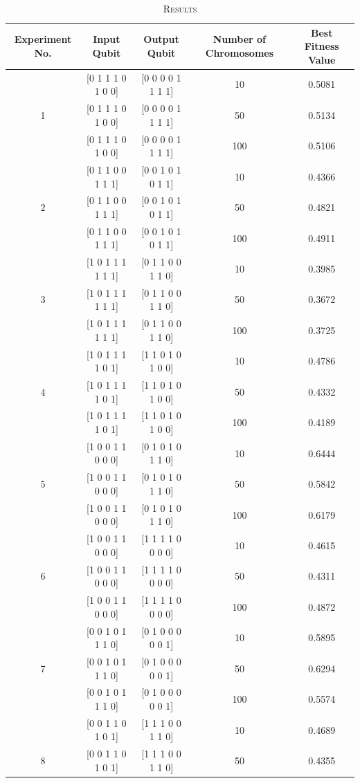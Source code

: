 \documentclass[conference]{IEEEtran}
\begin{document}
\begin{table}[!t]
\caption{\textsc{Results}}
\label{tab:2}
\centering
{
\begin{tabular}{| c | c | c | c | c |}
\hline
Experiment No. & Input Qubit & Output Qubit & Number of Chromosomes &  Best Fitness Value \\
\hline
 & [0 1 1 1 0 1 0 0] & [0 0 0 0 1 1 1 1] & 10 & 0.5081 \\
1 & [0 1 1 1 0 1 0 0] & [0 0 0 0 1 1 1 1] & 50 & 0.5134 \\
 & [0 1 1 1 0 1 0 0] & [0 0 0 0 1 1 1 1] & 100 & 0.5106 \\
\hline
 & [0 1 1 0 0 1 1 1] & [0 0 1 0 1 0 1 1] & 10 & 0.4366 \\
2 & [0 1 1 0 0 1 1 1] & [0 0 1 0 1 0 1 1] & 50 & 0.4821 \\
 & [0 1 1 0 0 1 1 1] & [0 0 1 0 1 0 1 1] & 100 & 0.4911 \\
\hline
 & [1 0 1 1 1 1 1 1] & [0 1 1 0 0 1 1 0] & 10 & 0.3985 \\
3 & [1 0 1 1 1 1 1 1] & [0 1 1 0 0 1 1 0] & 50 & 0.3672 \\
 & [1 0 1 1 1 1 1 1] & [0 1 1 0 0 1 1 0] & 100 & 0.3725 \\
\hline
 & [1 0 1 1 1 1 0 1] & [1 1 0 1 0 1 0 0] & 10 & 0.4786 \\
4 & [1 0 1 1 1 1 0 1] & [1 1 0 1 0 1 0 0] & 50 & 0.4332 \\
 & [1 0 1 1 1 1 0 1] & [1 1 0 1 0 1 0 0] & 100 & 0.4189 \\
\hline
 & [1 0 0 1 1 0 0 0] & [0 1 0 1 0 1 1 0] & 10 & 0.6444 \\
5 & [1 0 0 1 1 0 0 0] & [0 1 0 1 0 1 1 0] & 50 & 0.5842 \\
 & [1 0 0 1 1 0 0 0] & [0 1 0 1 0 1 1 0] & 100 & 0.6179 \\
\hline
 & [1 0 0 1 1 0 0 0] & [1 1 1 1 0 0 0 0] & 10 & 0.4615 \\
6 & [1 0 0 1 1 0 0 0] & [1 1 1 1 0 0 0 0] & 50 & 0.4311 \\
 & [1 0 0 1 1 0 0 0] & [1 1 1 1 0 0 0 0] & 100 & 0.4872 \\
\hline
 & [0 0 1 0 1 1 1 0] & [0 1 0 0 0 0 0 1] & 10 & 0.5895 \\
7 & [0 0 1 0 1 1 1 0] & [0 1 0 0 0 0 0 1] & 50 & 0.6294 \\
 & [0 0 1 0 1 1 1 0] & [0 1 0 0 0 0 0 1] & 100 & 0.5574 \\
\hline
 & [0 0 1 1 0 1 0 1] & [1 1 1 0 0 1 1 0] & 10 & 0.4689 \\
8 & [0 0 1 1 0 1 0 1] & [1 1 1 0 0 1 1 0] & 50 & 0.4355 \\

\end{tabular}}
\end{table}
\end{document}
